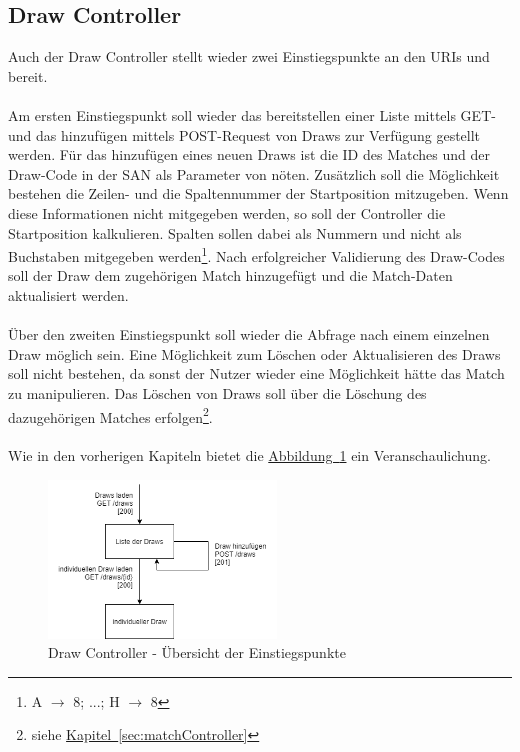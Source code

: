 \subsection{Draw Controller}\label{sec:drawController}
Auch der Draw Controller stellt wieder zwei Einstiegspunkte an den \glspl{URI}  und  bereit. \\
\\
Am ersten Einstiegspunkt soll wieder das bereitstellen einer Liste mittels GET- und das hinzufügen mittels POST-Request von Draws zur Verfügung gestellt werden. Für das hinzufügen eines neuen Draws ist die ID des Matches und der Draw-Code in der \gls{SAN} als Parameter von nöten. Zusätzlich soll die Möglichkeit bestehen die Zeilen- und die Spaltennummer der Startposition mitzugeben. Wenn diese Informationen nicht mitgegeben werden, so soll der Controller die Startposition kalkulieren. Spalten sollen dabei als Nummern und nicht als Buchstaben mitgegeben werden\footnote{A $\rightarrow$ 8; ...; H $\rightarrow$ 8}. Nach erfolgreicher Validierung des Draw-Codes soll der Draw dem zugehörigen Match hinzugefügt und die Match-Daten aktualisiert werden.\\
\\
Über den zweiten Einstiegspunkt soll wieder die Abfrage nach einem einzelnen Draw möglich sein. Eine Möglichkeit zum Löschen oder Aktualisieren des Draws soll nicht bestehen, da sonst der Nutzer wieder eine Möglichkeit hätte das Match zu manipulieren. Das Löschen von Draws soll über die Löschung des dazugehörigen Matches erfolgen\footnote{siehe \hyperref[sec:matchController]{Kapitel~\ref{sec:matchController}}}.\\
\\
Wie in den vorherigen Kapiteln bietet die \hyperref[fig:drawController]{Abbildung~\ref{fig:drawController}} ein Veranschaulichung.
\begin{figure}[htb]
	\includegraphics[width=0.54\textwidth]{images/draw-controller.png}
	\caption{Draw Controller - Übersicht der Einstiegspunkte}
	\label{fig:drawController}
\end{figure}

